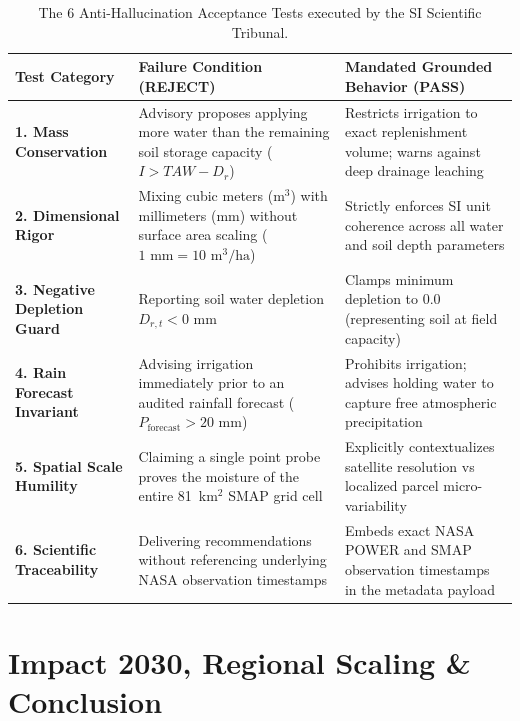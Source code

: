 \documentclass[11pt,a4paper,oneside]{report}
\begin{document}
\begin{table}[h!]
\centering
\small
\begin{tabularx}{\linewidth}{lXX}
\toprule
\textbf{Test Category} & \textbf{Failure Condition (REJECT)} & \textbf{Mandated Grounded Behavior (PASS)} \\
\midrule
\textbf{1. Mass Conservation} & Advisory proposes applying more water than the remaining soil storage capacity ($I > TAW - D_r$) & Restricts irrigation to exact replenishment volume; warns against deep drainage leaching \\
\textbf{2. Dimensional Rigor} & Mixing cubic meters ($\text{m}^3$) with millimeters ($\text{mm}$) without surface area scaling ($1\text{ mm} = 10\text{ m}^3/\text{ha}$) & Strictly enforces SI unit coherence across all water and soil depth parameters \\
\textbf{3. Negative Depletion Guard} & Reporting soil water depletion $D_{r,t} < 0\text{ mm}$ & Clamps minimum depletion to 0.0 (representing soil at field capacity) \\
\textbf{4. Rain Forecast Invariant} & Advising irrigation immediately prior to an audited rainfall forecast ($P_{\text{forecast}} > 20\text{ mm}$) & Prohibits irrigation; advises holding water to capture free atmospheric precipitation \\
\textbf{5. Spatial Scale Humility} & Claiming a single point probe proves the moisture of the entire 81~km$^2$ SMAP grid cell & Explicitly contextualizes satellite resolution vs localized parcel micro-variability \\
\textbf{6. Scientific Traceability} & Delivering recommendations without referencing underlying NASA observation timestamps & Embeds exact NASA POWER and SMAP observation timestamps in the metadata payload \\
\bottomrule
\end{tabularx}
\caption{The 6 Anti-Hallucination Acceptance Tests executed by the SI Scientific Tribunal.}
\label{tab:si_acceptance}
\end{table}

\chapter{Impact 2030, Regional Scaling \& Conclusion}
\end{document}
